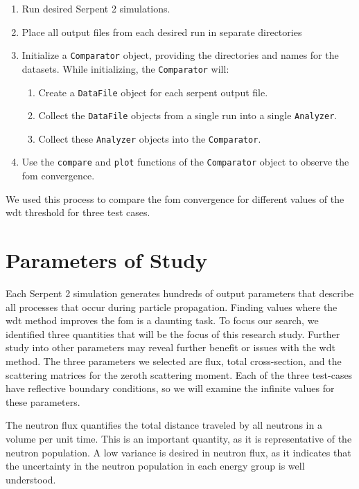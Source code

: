 \begin{enumerate}
\item Run desired Serpent 2 simulations.
\item Place all output files from each desired run in separate directories
\item Initialize a \verb|Comparator| object, providing the directories
  and names for the datasets. While initializing, the
  \verb|Comparator| will:
  \begin{enumerate}
  \item Create a \verb|DataFile| object for each serpent output file.
  \item Collect the \verb|DataFile| objects from a single run into a single
    \verb|Analyzer|.
  \item Collect these \verb|Analyzer| objects into the
    \verb|Comparator|.
  \end{enumerate}
\item Use the \verb|compare| and \verb|plot| functions of the
  \verb|Comparator| object to observe the \gls{fom} convergence.
\end{enumerate}
We used this process to compare the \gls{fom} convergence for
different values of the \gls{wdt} threshold for three test cases.

\section{Parameters of Study}
\label{sec:parameters}
Each Serpent 2 simulation generates hundreds of output parameters that
describe all processes that occur during particle propagation. Finding
values where the \gls{wdt} method improves the \gls{fom} is a daunting
task. To focus our search, we identified three  quantities that
will be the focus of this research study. Further study into other
parameters may reveal further benefit or issues with the \gls{wdt}
method. The three parameters we selected are flux, 
total cross-section, and the scattering matrices for the
zeroth scattering moment. Each of the three test-cases have
reflective boundary conditions, so we will examine the infinite values for these
parameters.

The neutron flux quantifies the total distance traveled by all
neutrons in a volume per unit time. This is an important quantity, as
it is representative of the neutron population. A low variance is
desired in neutron flux, as it indicates that the uncertainty in the
neutron population in each energy group is well
understood.

